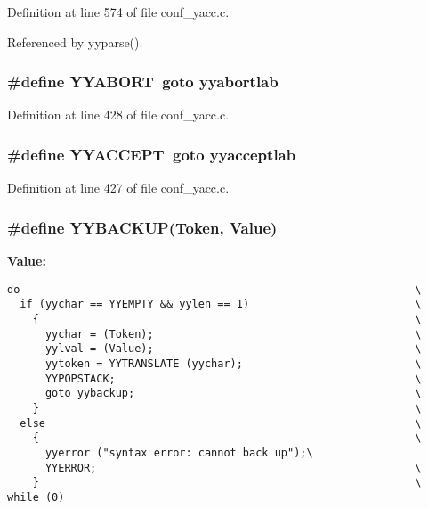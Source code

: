 Definition at line 574 of file conf\_\-yacc.c.

Referenced by yyparse().
\subsubsection{\setlength{\rightskip}{0pt plus 5cm}\#define YYABORT\ goto yyabortlab}\label{conf__yacc_8c_a42}




Definition at line 428 of file conf\_\-yacc.c.
\subsubsection{\setlength{\rightskip}{0pt plus 5cm}\#define YYACCEPT\ goto yyacceptlab}\label{conf__yacc_8c_a41}




Definition at line 427 of file conf\_\-yacc.c.
\subsubsection{\setlength{\rightskip}{0pt plus 5cm}\#define YYBACKUP(Token, Value)}\label{conf__yacc_8c_a46}


{\bf Value:}

\footnotesize\begin{verbatim}do                                                              \
  if (yychar == YYEMPTY && yylen == 1)                          \
    {                                                           \
      yychar = (Token);                                         \
      yylval = (Value);                                         \
      yytoken = YYTRANSLATE (yychar);                           \
      YYPOPSTACK;                                               \
      goto yybackup;                                            \
    }                                                           \
  else                                                          \
    {                                                           \
      yyerror ("syntax error: cannot back up");\
      YYERROR;                                                  \
    }                                                           \
while (0)
\end{verbatim}\normalsize 


